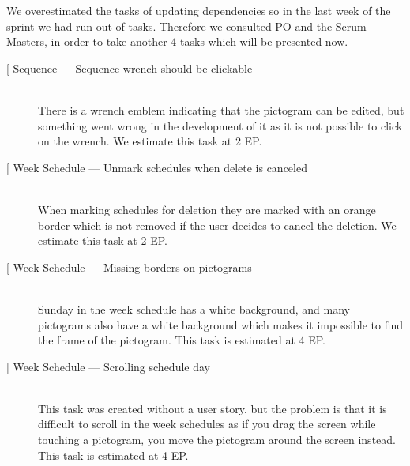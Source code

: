 We overestimated the tasks of updating dependencies so in the last week of the sprint we had run out of tasks.
Therefore we consulted PO and the Scrum Masters, in order to take another 4 tasks which will be presented now.

\begin{description}
    \item[{[}\phigh{]} Sequence --- Sequence wrench should be clickable] \hfill \\
        There is a wrench emblem indicating that the pictogram can be edited, but something went wrong in the development of it as it is not possible to click on the wrench.
        We estimate this task at 2 EP.
    \item[{[}\phigh{]} Week Schedule --- Unmark schedules when delete is canceled] \hfill \\
        When marking schedules for deletion they are marked with an orange border which is not removed if the user decides to cancel the deletion.
        We estimate this task at 2 EP.
    \item[{[}\phigh{]} Week Schedule --- Missing borders on pictograms] \hfill \\
        Sunday in the week schedule has a white background, and many pictograms also have a white background which makes it impossible to find the frame of the pictogram.
        This task is estimated at 4 EP.
    \item[{[}\phigh{]} Week Schedule --- Scrolling schedule day] \hfill\\
        This task was created without a user story, but the problem is that it is difficult to scroll in the week schedules as if you drag the screen while touching a pictogram, you move the pictogram around the screen instead.
        This task is estimated at 4 EP.
\end{description}
